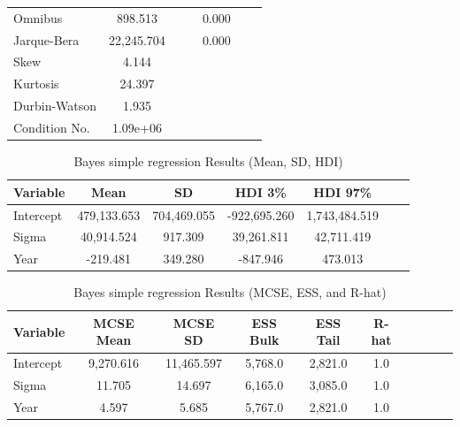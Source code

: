 \documentclass{article}
\begin{document}
\begin{table}[ht]
\begin{tabular}{lcccccc}
		\hline
		Omnibus              & 898.513              &                     &                      & 0.000            &                     \\
		Jarque-Bera          & 22,245.704           &                     &                      & 0.000            &                     \\
		Skew                 & 4.144                &                     &                      &                  &                     \\
		Kurtosis             & 24.397               &                     &                      &                  &                     \\
		Durbin-Watson        & 1.935                &                     &                      &                  &                     \\
		Condition No.        & 1.09e+06             &                     &                      &                  &                     \\
		\hline
	\end{tabular}
\end{table}

\begin{table}[ht]
	\centering
	\caption{Bayes simple regression Results (Mean, SD, HDI)}
	\begin{tabular}{lcccccc}
		\hline
		\textbf{Variable} & \textbf{Mean} & \textbf{SD} & \textbf{HDI 3\%} & \textbf{HDI 97\%} \\
		\hline
		Intercept         & 479,133.653   & 704,469.055 & -922,695.260     & 1,743,484.519     \\
		Sigma             & 40,914.524    & 917.309     & 39,261.811       & 42,711.419        \\
		Year              & -219.481      & 349.280     & -847.946         & 473.013           \\
		\hline
	\end{tabular}
\end{table}

\begin{table}[ht]
	\centering
	\caption{Bayes simple regression Results (MCSE, ESS, and R-hat)}
	\begin{tabular}{lccccccccc}
		\hline
		\textbf{Variable} & \textbf{MCSE Mean} & \textbf{MCSE SD} & \textbf{ESS Bulk} & \textbf{ESS Tail} & \textbf{R-hat} \\
		\hline
		Intercept         & 9,270.616          & 11,465.597       & 5,768.0           & 2,821.0           & 1.0            \\
		Sigma             & 11.705             & 14.697           & 6,165.0           & 3,085.0           & 1.0            \\
		Year              & 4.597              & 5.685            & 5,767.0           & 2,821.0           & 1.0            \\
		\hline
	\end{tabular}
\end{table}
\end{document}
